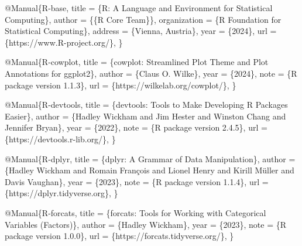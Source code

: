 \documentclass[
]{article}
\newenvironment{Shaded}{\begin{snugshade}}{\end{snugshade}}
\newcommand{\DataTypeTok}[1]{\textcolor[rgb]{0.13,0.29,0.53}{#1}}
\newcommand{\NormalTok}[1]{#1}
\newcommand{\OtherTok}[1]{\textcolor[rgb]{0.56,0.35,0.01}{#1}}
\newcommand{\VariableTok}[1]{\textcolor[rgb]{0.00,0.00,0.00}{#1}}
\begin{document}
\begin{Shaded}
\begin{Highlighting}[]
\VariableTok{@Manual}\NormalTok{\{}\OtherTok{R}\NormalTok{{-}}\OtherTok{base}\NormalTok{,}
  \DataTypeTok{title}\NormalTok{ = \{R: A Language and Environment for Statistical Computing\},}
  \DataTypeTok{author}\NormalTok{ = \{\{R Core Team\}\},}
  \DataTypeTok{organization}\NormalTok{ = \{R Foundation for Statistical Computing\},}
  \DataTypeTok{address}\NormalTok{ = \{Vienna, Austria\},}
  \DataTypeTok{year}\NormalTok{ = \{2024\},}
  \DataTypeTok{url}\NormalTok{ = \{https://www.R{-}project.org/\},}
\NormalTok{\}}

\VariableTok{@Manual}\NormalTok{\{}\OtherTok{R}\NormalTok{{-}}\OtherTok{cowplot}\NormalTok{,}
  \DataTypeTok{title}\NormalTok{ = \{cowplot: Streamlined Plot Theme and Plot Annotations for ggplot2\},}
  \DataTypeTok{author}\NormalTok{ = \{Claus O. Wilke\},}
  \DataTypeTok{year}\NormalTok{ = \{2024\},}
  \DataTypeTok{note}\NormalTok{ = \{R package version 1.1.3\},}
  \DataTypeTok{url}\NormalTok{ = \{https://wilkelab.org/cowplot/\},}
\NormalTok{\}}

\VariableTok{@Manual}\NormalTok{\{}\OtherTok{R}\NormalTok{{-}}\OtherTok{devtools}\NormalTok{,}
  \DataTypeTok{title}\NormalTok{ = \{devtools: Tools to Make Developing R Packages Easier\},}
  \DataTypeTok{author}\NormalTok{ = \{Hadley Wickham and Jim Hester and Winston Chang and Jennifer Bryan\},}
  \DataTypeTok{year}\NormalTok{ = \{2022\},}
  \DataTypeTok{note}\NormalTok{ = \{R package version 2.4.5\},}
  \DataTypeTok{url}\NormalTok{ = \{https://devtools.r{-}lib.org/\},}
\NormalTok{\}}

\VariableTok{@Manual}\NormalTok{\{}\OtherTok{R}\NormalTok{{-}}\OtherTok{dplyr}\NormalTok{,}
  \DataTypeTok{title}\NormalTok{ = \{dplyr: A Grammar of Data Manipulation\},}
  \DataTypeTok{author}\NormalTok{ = \{Hadley Wickham and Romain François and Lionel Henry and Kirill Müller and Davis Vaughan\},}
  \DataTypeTok{year}\NormalTok{ = \{2023\},}
  \DataTypeTok{note}\NormalTok{ = \{R package version 1.1.4\},}
  \DataTypeTok{url}\NormalTok{ = \{https://dplyr.tidyverse.org\},}
\NormalTok{\}}

\VariableTok{@Manual}\NormalTok{\{}\OtherTok{R}\NormalTok{{-}}\OtherTok{forcats}\NormalTok{,}
  \DataTypeTok{title}\NormalTok{ = \{forcats: Tools for Working with Categorical Variables (Factors)\},}
  \DataTypeTok{author}\NormalTok{ = \{Hadley Wickham\},}
  \DataTypeTok{year}\NormalTok{ = \{2023\},}
  \DataTypeTok{note}\NormalTok{ = \{R package version 1.0.0\},}
  \DataTypeTok{url}\NormalTok{ = \{https://forcats.tidyverse.org/\},}
\NormalTok{\}}


\end{Highlighting}
\end{Shaded}
\end{document}
